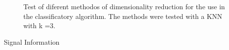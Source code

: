 \documentclass[a4paper, 12pt]{ppgeb}
\makeatletter
\renewcommand{\subsection}{\@startsection
{subsection}
{2}
{0mm}
{-\baselineskip}
{0.5\baselineskip}
{\bf\sffamily}}
\makeatother
\begin{document}
\begin{figure}
\begin{center}
\end{center}
\caption{Test of diferent methodos of dimensionality reduction for the use in the classificatory algorithm. The methods were tested with a \ac{KNN} with k =3.}
\label{fig_dim_reduction}
\end{figure}


\subsection{Signal Information}
\end{document}
